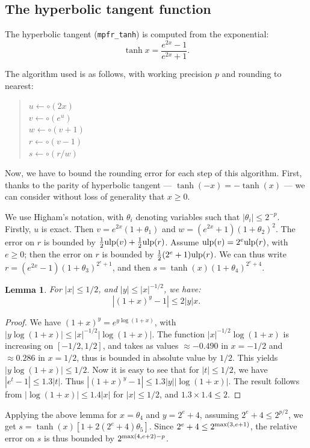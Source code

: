 \documentclass[12pt]{amsart}
\def\ulp{{\rm ulp}}
\newtheorem{lemma}{Lemma}
\begin{document}
\subsection{The hyperbolic tangent function}

The hyperbolic tangent (\texttt{mpfr\_tanh}) is computed from the exponential:
\[ \tanh x = \frac{ e^{2 x} -1 }{ e^{2 x} +1}. \]

The algorithm used is as follows, with working
precision $p$ and rounding to nearest:
\begin{quote}
$u \leftarrow \circ(2 x)$ \\
$v \leftarrow \circ(e^u)$ \\
$w \leftarrow \circ(v+1)$ \\
$r \leftarrow \circ(v-1)$ \\
$s \leftarrow \circ(r/w)$
\end{quote}
Now, we have to bound the rounding error for each step of this
algorithm.  First, thanks to the parity of hyperbolic tangent
--- $\tanh(-x)=-\tanh(x)$ --- we can consider without loss of generality
that $x \geq 0$.

We use Higham's notation, with $\theta_i$ denoting variables such that
$|\theta_i| \leq 2^{-p}$.
Firstly, $u$ is exact. Then $v = e^{2x} (1+\theta_1)$ and
$w = (e^{2x}+1) (1+\theta_2)^2$.
The error on $r$ is bounded by $\frac{1}{2} \ulp(v) + \frac{1}{2} \ulp(r)$.
Assume $\ulp(v) = 2^e \ulp(r)$, with $e \geq 0$;
then the error on $r$ is bounded by $\frac{1}{2} (2^e+1) \ulp(r)$.
We can thus write $r = (e^{2x}-1) (1+\theta_3)^{2^e+1}$,
and then $s = \tanh(x) (1+\theta_4)^{2^e+4}$.

\begin{lemma}
For $|x| \leq 1/2$, and $|y| \leq |x|^{-1/2}$, we have:
\[ |(1+x)^y-1| \leq 2 |y| x. \]
\end{lemma}
\begin{proof}
We have $(1+x)^y = e^{y \log (1+x)}$,
with $|y \log (1+x)| \leq |x|^{-1/2} |\log (1+x)|$.
The function $|x|^{-1/2} \log (1+x)$ is increasing on $[-1/2,1/2]$, and
takes as values $\approx -0.490$ in $x=-1/2$ and $\approx 0.286$ in $x=1/2$,
thus is bounded in absolute value by $1/2$.
This yields $|y \log (1+x)| \leq 1/2$.
Now it is easy to see that for $|t| \leq 1/2$, we have
$|e^t-1| \leq 1.3 |t|$.
Thus $|(1+x)^y-1| \leq 1.3 |y| |\log (1+x)|$.
The result follows from $|\log (1+x)| \leq 1.4 |x|$ for $|x| \leq 1/2$,
and $1.3 \times 1.4 \leq 2$.
\end{proof}

Applying the above lemma for $x=\theta_4$ and $y=2^e+4$,
assuming $2^e+4 \leq 2^{p/2}$,
we get $s = \tanh(x) [1 + 2(2^e+4)\theta_5]$.
Since $2^e+4 \leq 2^{{\rm max}(3,e+1)}$,
the relative error on $s$ is thus bounded by $2^{{\rm max}(4,e+2)-p}$.
\end{document}
